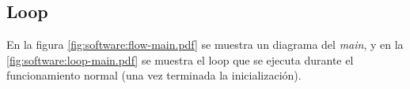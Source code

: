 \documentclass[main]{subfiles}
\begin{document}
\newpage
\subsection{Loop}
\label{sec:software-loop}

En la figura \ref{fig:software:flow-main.pdf} se muestra un diagrama del \textit{main}, y en la \ref{fig:software:loop-main.pdf} se muestra el loop que se ejecuta durante el funcionamiento normal (una vez terminada la inicializaci\'on).


\end{document}
